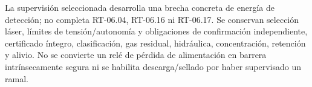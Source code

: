 La supervisión seleccionada desarrolla una brecha concreta de energía de detección; no completa RT-06.04, RT-06.16 ni RT-06.17. Se conservan selección láser, límites de tensión/autonomía y obligaciones de confirmación independiente, certificado íntegro, clasificación, gas residual, hidráulica, concentración, retención y alivio. No se convierte un relé de pérdida de alimentación en barrera intrínsecamente segura ni se habilita descarga/sellado por haber supervisado un ramal.
